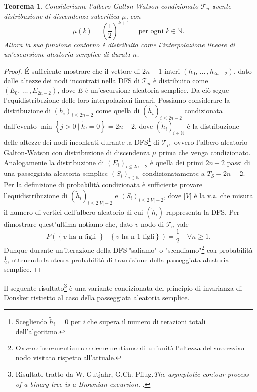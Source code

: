 \documentclass[11pt, twoside]{report}
\newcommand{\Tt}{\mathscr{T}}
\theoremstyle{definition}
\theoremstyle{plain}
\newtheorem{teo}{Teorema}[chapter]
\theoremstyle{remark}
\numberwithin{equation}{chapter}
\begin{document}
\begin{teo} \label{teo_srw_1}
Consideriamo l'albero Galton-Watson condizionato $\Tt_n$ avente distribuzione di discendenza subcritica $\mu$, con
$$\mu(k)=\left(\frac{1}{2}\right)^{k+1} \quad \text{ per ogni } k\in\mathbb{N}.$$
Allora la sua funzione contorno è distribuita come l'interpolazione lineare di un'escursione aleatoria semplice di durata $n$.
\end{teo}
\begin{proof}
\'E sufficiente mostrare che il vettore di $2n-1$ interi $\left(h_0,  \, \dots \, ,h_{2n-2}\right)$, dato dalle altezze dei nodi incontrati nella DFS di $\Tt_n$ è distribuito come $\left(E_0,  \, \dots \, ,E_{2n-2}\right)$, dove $E$ è un'escursione aleatoria semplice. Da ciò segue l'equidistribuzione delle loro interpolazioni lineari. Possiamo considerare la distribuzione di $(h_i)_{i\leq 2n-2}$ come quella di $(\tilde{h}_i)_{i\leq 2n-2}$ condizionata dall'evento $\min\left\{j>0 \ | \ \tilde{h}_j=0\right\}=2n-2$, dove $(\tilde{h}_i)_{i\in \mathbb{N}}$ è la distribuzione delle altezze dei nodi incontrati durante la DFS\footnote{Scegliendo $\tilde{h}_i=0$ per $i$ che supera il numero di terazioni totali dell'algoritmo.} di $\Tt_{\mu}$, ovvero l'albero aleatorio Galton-Watson con distribuzione di discendenza $\mu$ prima che venga condizionato. 
Analogamente la distribuzione di $(E_i)_{i\leq 2n-2}$ è quella dei primi $2n-2$ passi di una passeggiata aleatoria semplice $(S_i)_{i\in \mathbb{N}}$ condizionatamente a $T_S=2n-2$.\\
Per la definizione di probabilità condizionata è sufficiente provare l'equidistribuzione di $(\tilde{h}_i)_{i\leq 2|V|-2}$ e $(S_i)_{i\leq 2|V|-2}$, dove $|V|$ è la v.a. che misura il numero di vertici dell'albero aleatorio di cui $(\tilde{h}_i)$ rappresenta la DFS. Per dimostrare quest'ultima notiamo che, dato $v$ nodo di $\Tt_n$ vale
$$P\left(\left\{v \text{ ha n figli } \right\} \ | \ \left\{v \text{ ha n-1 figli}\right\} \right)=\frac{1}{2} \quad \forall n \geq 1.$$
Dunque durante un'iterazione della DFS "saliamo" o "scendiamo"\footnote{Ovvero incrementiamo o decrementiamo di un'unità l'altezza del successivo nodo visitato rispetto all'attuale.} con probabilità $\frac{1}{2}$, ottenendo la stessa probabilità di transizione della passeggiata aleatoria semplice.
\end{proof}

Il seguente risultato\footnote{Risultato tratto da  W. Gutjahr, G.Ch. Pflug.\textit{The asymptotic contour process of a binary tree is a Brownian excursion.} \cite{condiDonsker}.} è una variante condizionata del principio di invarianza di Donsker ristretto al caso della passeggiata aleatoria semplice.
\end{document}

